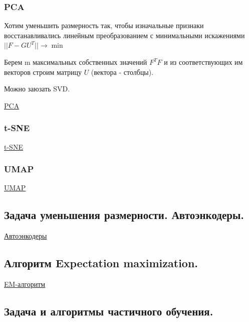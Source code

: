 \documentclass{article}
\begin{document}
\subsubsection{PCA}

Хотим уменьшить размерность так, чтобы изначальные признаки восстанавливались
линейным преобразованием с минимальными искажениями $||F - GU^T|| \to \min$

Берем m максимальных собственных значений $F^T F$ и из соответствующих им
векторов строим матрицу $U$ (вектора - столбцы).

Можно заюзать SVD.

\href{
	https://neerc.ifmo.ru/wiki/index.php?title=%
}{PCA}

\subsubsection{t-SNE}
\href{
	https://neerc.ifmo.ru/wiki/index.php?title=%
}{t-SNE}

\subsubsection{UMAP}
\href{
	https://ru.wikipedia.org/wiki/UMAP
}{UMAP}


\subsection{Задача уменьшения размерности. Автоэнкодеры.}

\href{
	https://neerc.ifmo.ru/wiki/index.php?title=%
}{Автоэнкодеры}


\subsection{Алгоритм Expectation maximization.}

\href{
	https://neerc.ifmo.ru/wiki/index.php?title=EM-%
}{EM-алгоритм}


\subsection{Задача и алгоритмы частичного обучения.}
\end{document}
